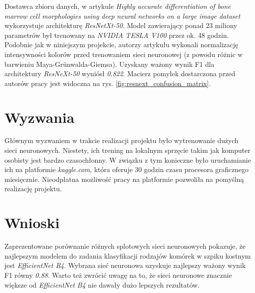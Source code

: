 Dostawca zbioru danych, w artykule \textit{Highly accurate differentiation of bone marrow cell morphologies using deep neural networks on a large image dataset}~\cite{resnext} wykorzystuje architekturę \textit{ResNetXt-50}.
Model zawierający ponad 23 miliony parametrów był trenowany na \textit{NVIDIA TESLA V100} przez ok. 48 godzin.
Podobnie jak w niniejszym projekcie, autorzy artykułu wykonali normalizację intensywności kolorów przed trenowaniem sieci neuronowej (z powodu różnic w barwieniu Maya-Grünwalda-Giemsa).
Uzyskany ważony wynik F1 dla architektury \textit{ResNeXt-50} wyniósł \textit{0.822}.
Macierz pomyłek dostarczona przed autorów pracy jest widoczna na rys. \ref{fig:resnext_confusion_matrix}.


\section{Wyzwania}

Głównym wyzwaniem w trakcie realizacji projektu było wytrenowanie dużych sieci neuronowych.
Niestety, ich trening na lokalnym sprzęcie takim jak komputer osobisty jest bardzo czasochłonny.
W związku z tym konieczne było uruchamianie ich na platformie \textit{kaggle.com}, która oferuje 30 godzin czasu procesora graficznego miesięcznie.
Nieodpłatna możliwość pracy na platformie pozwoliła na pomyślną realizację projektu.


\section{Wnioski}

Zaprezentowane porównanie różnych splotowych sieci neuronowych pokazuje, że najlepszym modelem do zadania klasyfikacji rodzajów komórek w szpiku kostnym jest \textit{EfficientNet B4}.
Wybrana sieć neuronowa uzyskuje najlepszy ważony wynik F1 równy \textit{0.88}.
Warto też zwrócić uwagę na to, że sieci neuronowe znacznie większe od \textit{EfficientNet B4} nie dawały dużo lepszych rezultatów.

